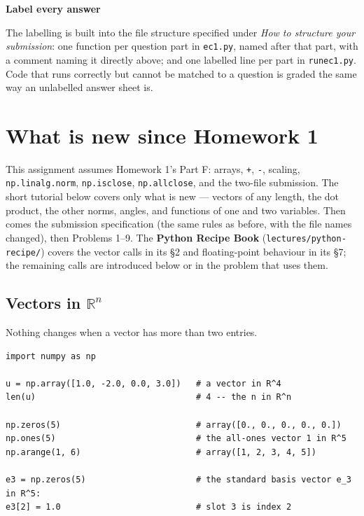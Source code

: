 \documentclass[11pt]{article}
\newcounter{prob}
\newenvironment{callout}[1]
  {\par\medskip\needspace{5\baselineskip}%
   \begin{lrbox}{\qcbox}%
   \begin{minipage}{\dimexpr\textwidth-2\fboxsep-4pt}%
   \setlength{\parskip}{0.4em}%
   \textbf{\sffamily\color{RoyalBlue}#1}\par}
  {\end{minipage}\end{lrbox}%
   \begin{center}\colorbox{softbg}{\usebox{\qcbox}}\end{center}\medskip}
\newcommand{\R}{\mathbb{R}}
\begin{document}
\begin{callout}{Label every answer}
The labelling is built into the file structure specified under \emph{How to
structure your submission}: one function per question part in \texttt{ec1.py},
named after that part, with a comment naming it directly above; and one labelled
line per part in \texttt{runec1.py}. Code that runs correctly but cannot be
matched to a question is graded the same way an unlabelled answer sheet is.
\end{callout}

\section{What is new since Homework 1}
\noindent This assignment assumes Homework 1's Part F: arrays, \texttt{+},
\texttt{-}, scaling, \texttt{np.linalg.norm}, \texttt{np.isclose},
\texttt{np.allclose}, and the two-file submission. The short tutorial below
covers only what is new --- vectors of any length, the dot product, the other
norms, angles, and functions of one and two variables. Then comes the submission
specification (the same rules as before, with the file names changed), then
Problems 1--9. The \textbf{Python Recipe Book} (\texttt{lectures/python-recipe/})
covers the vector calls in its \S2 and floating-point behaviour in its \S7; the
remaining calls are introduced below or in the problem that uses them.

\subsection{Vectors in \texorpdfstring{$\R^{n}$}{Rn}}

Nothing changes when a vector has more than two entries.

\begin{lstlisting}
import numpy as np

u = np.array([1.0, -2.0, 0.0, 3.0])   # a vector in R^4
len(u)                                # 4 -- the n in R^n

np.zeros(5)                           # array([0., 0., 0., 0., 0.])
np.ones(5)                            # the all-ones vector 1 in R^5
np.arange(1, 6)                       # array([1, 2, 3, 4, 5])

e3 = np.zeros(5)                      # the standard basis vector e_3 in R^5:
e3[2] = 1.0                           # slot 3 is index 2
\end{lstlisting}
\end{document}
